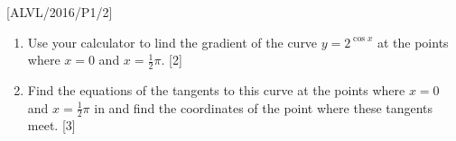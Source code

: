 \item {[}ALVL/2016/P1/2{]}
\begin{enumerate}
\item Use your calculator to lind the gradient of the curve $y=2^{\cos x}$
at the points where $x=0$ and $x=\frac{1}{2}\pi$. \hfill{}{[}2{]}
\item Find the equations of the tangents to this curve at the points where
$x=0$ and $x=\frac{1}{2}\pi$ in and find the coordinates of the
point where these tangents meet. \hfill{}{[}3{]}
\end{enumerate}
